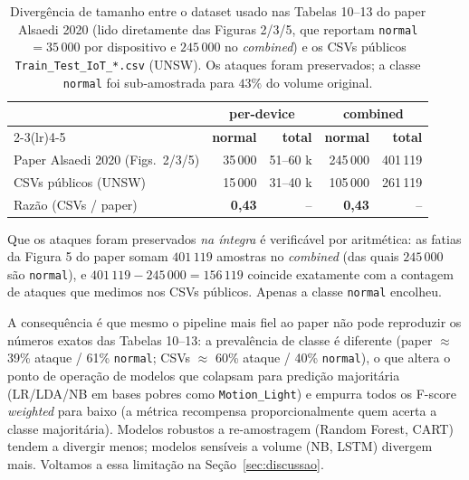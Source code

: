 \begin{table}[ht]
  \centering
  \caption{Divergência de tamanho entre o dataset usado nas
           Tabelas 10--13 do paper Alsaedi 2020 (lido diretamente das
           Figuras 2/3/5, que reportam \texttt{normal} $=35\,000$ por
           dispositivo e $245\,000$ no \emph{combined}) e os CSVs
           públicos \texttt{Train\_Test\_IoT\_*.csv} (UNSW). Os ataques
           foram preservados; a classe \texttt{normal} foi sub-amostrada
           para $43\%$ do volume original.}
  \label{tab:mismatch}
  \small
  \begin{tabular}{lrrrr}
    \toprule
    & \multicolumn{2}{c}{\textbf{per-device}} & \multicolumn{2}{c}{\textbf{combined}} \\
    \cmidrule(lr){2-3}\cmidrule(lr){4-5}
    & \textbf{normal} & \textbf{total} & \textbf{normal} & \textbf{total} \\
    \midrule
    Paper Alsaedi 2020 (Figs.\ 2/3/5) & 35\,000 & 51--60 k & 245\,000 & 401\,119 \\
    CSVs públicos (UNSW) & 15\,000 & 31--40 k & 105\,000 & 261\,119 \\
    \midrule
    Razão (CSVs / paper)             & \textbf{0{,}43} & -- & \textbf{0{,}43} & -- \\
    \bottomrule
  \end{tabular}
\end{table}

Que os ataques foram preservados \emph{na íntegra} é verificável por
aritmética: as fatias da Figura 5 do paper somam $401\,119$ amostras no
\emph{combined} (das quais $245\,000$ são \texttt{normal}), e
$401\,119 - 245\,000 = 156\,119$ coincide exatamente com a contagem de
ataques que medimos nos CSVs públicos. Apenas a classe \texttt{normal}
encolheu.

A consequência é que mesmo o pipeline mais fiel ao paper não pode
reproduzir os números exatos das Tabelas 10--13: a prevalência de
classe é diferente (paper $\approx$ 39\% ataque / 61\% \texttt{normal};
CSVs $\approx$ 60\% ataque / 40\% \texttt{normal}), o que altera o ponto
de operação de modelos que colapsam
para predição majoritária (LR/LDA/NB em bases pobres como
\texttt{Motion\_Light}) e empurra todos os F-score \emph{weighted}
para baixo (a métrica recompensa proporcionalmente quem acerta a
classe majoritária). Modelos robustos a re-amostragem
(Random Forest, CART) tendem a divergir menos; modelos sensíveis a
volume (NB, LSTM) divergem mais. Voltamos a essa limitação na
Seção~\ref{sec:discussao}.

